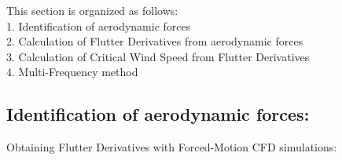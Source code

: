 \documentclass[a4paper, 12pt]{report}
\begin{document}
\begin{flushleft}
This section is organized as follows: \\
\hspace{2cm}1. Identification of aerodynamic forces \\
\hspace{2cm}2. Calculation of Flutter Derivatives from aerodynamic forces \\
\hspace{2cm}3. Calculation of Critical Wind Speed from Flutter Derivatives \\
\hspace{2cm}4. Multi-Frequency method \\
\end{flushleft}

\subsection*{Identification of aerodynamic forces:}

Obtaining Flutter Derivatives with Forced-Motion CFD simulations:
\end{document}
